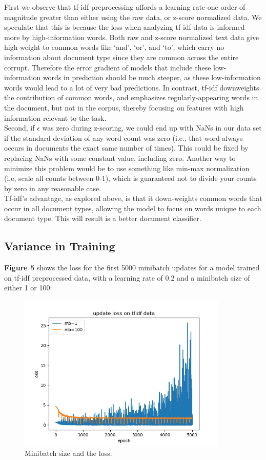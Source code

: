 \documentclass{amsart}
\theoremstyle{definition}
\theoremstyle{remark}
\numberwithin{equation}{section}
\begin{document}
First we observe that tf-idf preprocessing affords a learning rate one order of
magnitude greater than either using the raw data, or z-score normalized data. We
speculate that this is because the loss when analyzing tf-idf data is informed
more by high-information words. Both raw and z-score normalized text data give
high weight to common words like `and', `or', and `to', which carry no
information about document type since they are common across the entire corrupt.
Therefore the error gradient of models that include these low-information words
in prediction should be much steeper, as these low-information words would lead
to a lot of very bad predictions. In contrast, tf-idf downweights the
contribution of common words, and emphasizes regularly-appearing words in the
document, but not in the corpus, thereby focusing on features with high
information relevant to the task. \\

Second, if $\epsilon$ was zero during z-scoring, we could end up with NaNs in our
data set if the standard deviation of any word count was zero (i.e., that word
always occurs in documents the exact same number of times). This could be fixed
by replacing NaNs with some constant value, including zero. Another way to
minimize this problem would be to use something like min-max normalization (i.e,
scale all counts between 0-1), which is guaranteed not to divide your counts by
zero in any reasonable case. \\

Tf-idf's advantage, as explored above, is that it down-weights common words that
occur in all document types, allowing the model to focus on words unique to each
document type. This will result is a better document classifier. \\

\subsection{Variance in Training}

\textbf{Figure 5} shows the loss for the first 5000 minibatch updates for a model trained
on tf-idf preprocessed data, with a learning rate of 0.2 and a minibatch size of
either 1 or 100: \\

\begin{figure}[h]
\includegraphics[width=100mm]{05_mbsize}
\caption{Minibatch size and the loss.}
\label{Figure 5}
\end{figure}
\end{document}
